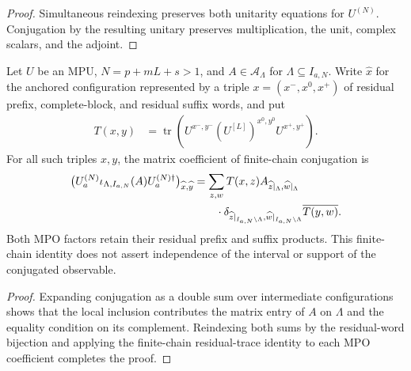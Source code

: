\begin{proof}\leanok
    Simultaneous reindexing preserves both unitarity equations for $U^{(N)}$.
    Conjugation by the resulting unitary preserves multiplication, the unit,
    complex scalars, and the adjoint.
\end{proof}

\begin{lemma}
    \label{thm:mpu_anchored_residual_conjugation_entry}
    \leanok
    Let $U$ be an MPU, $N=p+mL+s>1$, and $A\in\mathcal A_\Lambda$
    for $\Lambda\subseteq I_{a,N}$. Write $\widehat x$ for the anchored
    configuration represented by a triple $x=(x^-,x^0,x^+)$ of residual
    prefix, complete-block, and residual suffix words, and put
    \begin{align}
        T(x,y) & =\operatorname{tr}\!\left(
        U^{x^-,y^-}(U^{[L]})^{x^0,y^0}U^{x^+,y^+}\right).
    \end{align}
    For all such triples $x,y$, the matrix coefficient of finite-chain
    conjugation is
    \begin{align}
        \bigl(U_a^{(N)}\iota_{\Lambda,I_{a,N}}(A)
        U_a^{(N)\dagger}\bigr)_{\widehat x,\widehat y}
         & =\sum_{z,w} T(x,z)A_{\widehat z|_\Lambda,\widehat w|_\Lambda}
        \notag                                                           \\
         & \qquad\cdot
        \delta_{\widehat z|_{I_{a,N}\setminus\Lambda},
            \widehat w|_{I_{a,N}\setminus\Lambda}}
        \overline{T(y,w)}.
    \end{align}
    Both MPO factors retain their residual prefix and suffix products.
    This finite-chain identity does not assert independence of the
    interval or support of the conjugated observable.
\end{lemma}

\begin{proof}\leanok
    Expanding conjugation as a double sum over intermediate configurations shows that
    the local inclusion contributes the matrix entry of $A$ on $\Lambda$
    and the equality condition on its complement. Reindexing both sums by
    the residual-word bijection and applying the finite-chain residual-trace
    identity to each MPO coefficient completes the proof.
\end{proof}

